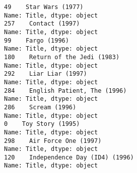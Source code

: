 \documentclass[11pt]{article}
\begin{document}
    \begin{Verbatim}[commandchars=\\\{\}]
49    Star Wars (1977)
Name: Title, dtype: object
257    Contact (1997)
Name: Title, dtype: object
99    Fargo (1996)
Name: Title, dtype: object
180    Return of the Jedi (1983)
Name: Title, dtype: object
292    Liar Liar (1997)
Name: Title, dtype: object
284    English Patient, The (1996)
Name: Title, dtype: object
286    Scream (1996)
Name: Title, dtype: object
0    Toy Story (1995)
Name: Title, dtype: object
298    Air Force One (1997)
Name: Title, dtype: object
120    Independence Day (ID4) (1996)
Name: Title, dtype: object

    \end{Verbatim}

    \begin{center}
    \end{center}
    { \hspace*{\fill} \\}
    
    \begin{center}
    \end{center}
    { \hspace*{\fill} \\}
    
\end{document}
